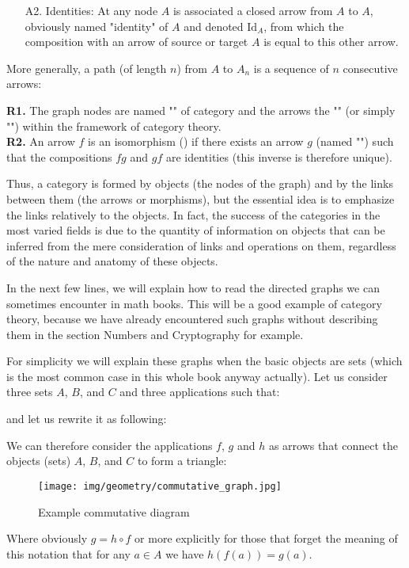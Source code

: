 {\begin{enumerate}
		\item[A2.] Identities: At any node $A$ is associated a closed arrow from $A$ to $A$, obviously named "identity" of $A$ and denoted $\text{Id}_A$, from which the composition with an arrow of source or target $A$ is equal to this other arrow.
	\end{enumerate}
	More generally, a path (of length $n$) from $A$ to $A_n$ is a sequence of $n$ consecutive arrows:
	
	\begin{tcolorbox}[title=Remarks,colframe=black,arc=10pt]
	\textbf{R1.} The graph nodes are named "" of category and the arrows the "" (or simply "") within the framework of category theory.\\
	
	\textbf{R2.} An arrow $f$ is an isomorphism () if there exists an arrow $g$ (named "") such that the compositions $fg$ and $gf$ are identities (this inverse is therefore unique).
	\end{tcolorbox}	
	Thus, a category is formed by objects (the nodes of the graph) and by the links between them (the arrows or morphisms), but the essential idea is to emphasize the links relatively to the objects. In fact, the success of the categories in the most varied fields is due to the quantity of information on objects that can be inferred from the mere consideration of links and operations on them, regardless of the nature and anatomy of these objects.
	
	In the next few lines, we will explain how to read the directed graphs we can sometimes encounter in math books. This will be a good example of category theory, because we have already encountered such graphs without describing them in the section Numbers and Cryptography for example.
	
	For simplicity we will explain these graphs when the basic objects are  sets (which is the most common case in this whole book anyway actually).
	Let us consider three sets $A$, $B$, and $C$ and three applications such that:
	
	and let us rewrite it as following:
	
	We can therefore consider the applications $f$, $g$ and $h$ as arrows that connect the objects (sets) $A$, $B$, and $C$ to form a triangle:
	\begin{figure}[H]
		\centering
		\texttt{[image: img/geometry/commutative\_graph.jpg]}
		\caption{Example commutative diagram}
	\end{figure}
	Where obviously $g=h\circ f$ or more explicitly for those that forget the meaning of this notation that for any $a\in A$ we have $h(f(a))=g(a)$.
	
}
